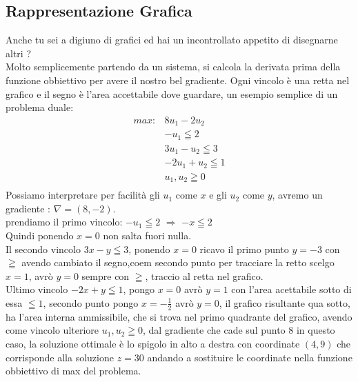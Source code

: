 \documentclass{article}
\begin{document}
\subsection{Rappresentazione Grafica}
Anche tu sei a digiuno di grafici ed hai un incontrollato appetito di disegnarne altri ?\\
Molto semplicemente partendo da un sistema, si calcola la derivata prima della funzione obbiettivo per avere il nostro bel gradiente.
Ogni vincolo è una retta nel grafico e il segno è l'area accettabile dove guardare, un esempio semplice di un problema duale:\\
\begin{align*}
max: &8u_1 - 2u_2 \\
&-u_1 \leqq 2  \\
&3u_1 - u_2 \leqq 3   \\
&-2u_1 + u_2 \leqq 1   \\
&u_1, u_2 \geqq 0 \\
\end{align*}
Possiamo interpretare per facilità gli $u_1$ come $x$ e gli $u_2$ come $y$, avremo un gradiente : $\nabla = (8,-2)$.\\
prendiamo il primo vincolo: $-u_1 \leqq 2$ $\Rightarrow$ $-x \leqq 2$\\
Quindi ponendo $x=0$ non salta fuori nulla.\\
Il secondo vincolo $3x -y \leqq 3$, ponendo $x=0$ ricavo il primo punto $y= -3$
con $\geqq $ avendo cambiato il segno,coem secondo punto per tracciare la retto scelgo $x=1$, avrò $y=0$ sempre con $\geqq $, traccio al retta nel grafico.\\
Ultimo vincolo $-2x +y \leqq 1$, pongo $x=0$ avrò $y = 1$ con l'area acettabile sotto di essa $\leqq 1$, secondo punto pongo $x=-\frac{1}{2}$ avrò $y=0$, il grafico risultante qua sotto, ha l'area interna ammissibile, che si trova nel primo quadrante del grafico, avendo come vincolo ulteriore $u_1,u_2 \geqq 0$, dal gradiente che cade sul punto 8 in questo caso, la soluzione ottimale è lo spigolo in alto a destra con coordinate $(4,9)$ che corrisponde alla soluzione $z = 30$ andando a sostituire le coordinate nella funzione obbiettivo di max del problema.
\begin{center}
\end{center}
\newpage
\end{document}
